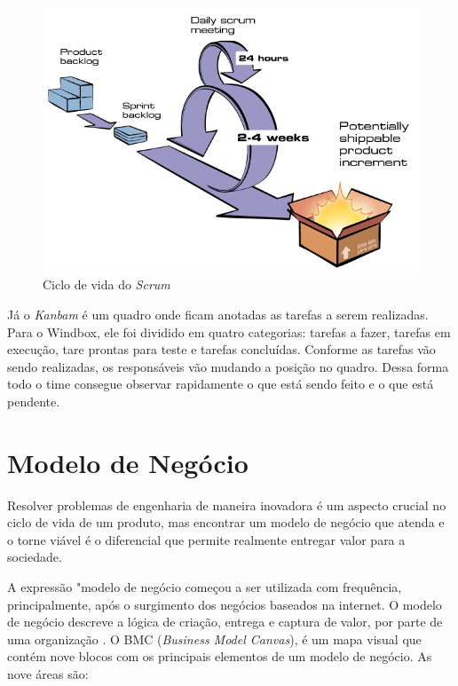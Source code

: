 \begin{figure}[htbp!] \begin{center}
\includegraphics[width=0.75\linewidth]{./figuras/scrum-diagrama}
\caption{Ciclo de vida do \textit{Scrum}}
\label{Fig:cicloScrum}
\end{center} 
\end{figure}

Já o \textit{Kanbam} é um quadro onde ficam anotadas as tarefas a serem realizadas. Para o Windbox, ele foi dividido em quatro categorias: tarefas a fazer, tarefas em execução, tare prontas para teste e tarefas concluídas. Conforme as tarefas vão sendo realizadas, os responsáveis vão mudando a posição no quadro. Dessa forma todo o time consegue observar rapidamente o que está sendo feito e o que está pendente.

\section{Modelo de Negócio}
\label{Sec:modeloDeNegocio}

Resolver problemas de engenharia de maneira inovadora é um aspecto crucial no ciclo de vida de um produto, mas encontrar um modelo de negócio que atenda e o torne viável é o diferencial que permite realmente entregar valor para a sociedade.

A expressão "modelo de negócio começou a ser utilizada com frequência, principalmente, após o surgimento dos negócios baseados na internet. O modelo de negócio descreve a lógica de criação, entrega e captura de valor, por parte de uma organização \cite{business-model-generation}. O BMC (\textit{Business Model Canvas}), é um mapa visual que contém nove blocos com os principais elementos de um modelo de negócio. As nove áreas são:

